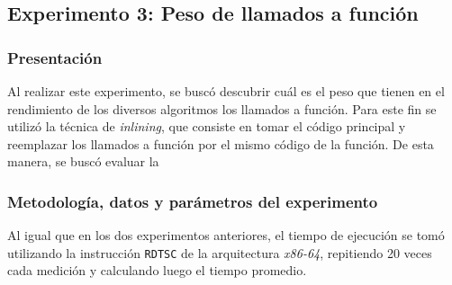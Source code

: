 

    \subsection{Experimento 3: Peso de llamados a función}

        \subsubsection*{Presentación}
            Al realizar este experimento, se buscó descubrir cuál es el peso que tienen en el rendimiento de los diversos algoritmos los llamados a función. Para este fin se utilizó la técnica de \emph{inlining}, que consiste en tomar el código principal y reemplazar los llamados a función por el mismo código de la función. De esta manera, se buscó evaluar la 


        \subsubsection*{Metodología, datos y parámetros del experimento}
            Al igual que en los dos experimentos anteriores, el tiempo de ejecución se tomó utilizando la instrucción \texttt{RDTSC} de la arquitectura \emph{x86-64}, repitiendo 20 veces cada medición y calculando luego el tiempo promedio.

